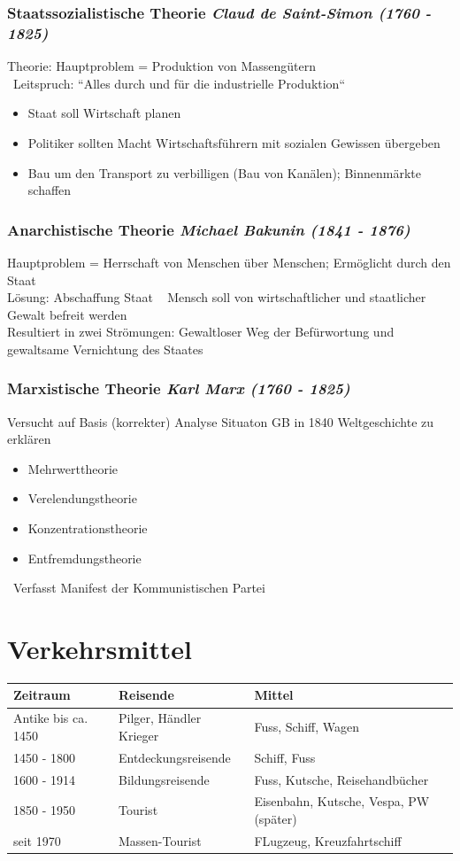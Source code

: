 \documentclass{report}
\begin{document}
\subsection{Staatssozialistische Theorie \rm{\textit{Claud de Saint-Simon (1760 - 1825)}}}
Theorie: Hauptproblem = Produktion von Massengütern\\
\arrow~Leitspruch: ``Alles durch und für die industrielle Produktion``
\begin{itemize}
	\item Staat soll Wirtschaft planen
	\item Politiker sollten Macht Wirtschaftsführern mit sozialen Gewissen übergeben
	\item Bau um den Transport zu verbilligen (Bau von Kanälen); Binnenmärkte schaffen
\end{itemize}

\subsection{Anarchistische Theorie \rm{\textit{Michael Bakunin (1841 - 1876)}}}
Hauptproblem = Herrschaft von Menschen über Menschen; Ermöglicht durch den Staat\\
Lösung: Abschaffung Staat \arrow~ Mensch soll von wirtschaftlicher und staatlicher Gewalt befreit werden\\
Resultiert in zwei Strömungen: Gewaltloser Weg der Befürwortung und gewaltsame Vernichtung des Staates

\subsection{Marxistische Theorie \rm{\textit{Karl Marx (1760 - 1825)}}}
Versucht auf Basis (korrekter) Analyse Situaton GB in 1840 Weltgeschichte zu erklären
\begin{itemize}
	\item Mehrwerttheorie
	\item Verelendungstheorie
	\item Konzentrationstheorie
	\item Entfremdungstheorie
\end{itemize}
\arrow~Verfasst Manifest der Kommunistischen Partei

\chapter{Verkehrsmittel}
\begin{tabular}{ l | l | l}
	\textbf{Zeitraum} & \textbf{Reisende} & \textbf{Mittel}\\ \hline
	Antike bis ca. 1450 & Pilger, Händler Krieger & Fuss, Schiff, Wagen \\ \hline
	1450 - 1800 & Entdeckungsreisende & Schiff, Fuss \\ \hline
	1600 - 1914 & Bildungsreisende & Fuss, Kutsche, Reisehandbücher\\ \hline
	1850 - 1950 & Tourist & Eisenbahn, Kutsche, Vespa, PW (später)\\ \hline
	seit 1970 & Massen-Tourist & FLugzeug, Kreuzfahrtschiff
\end{tabular}~
\end{document}
